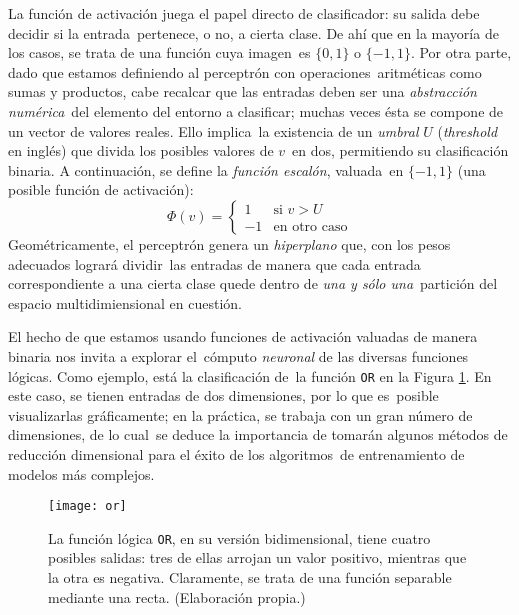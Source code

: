 La función de activación juega el papel directo de clasificador: su salida debe decidir si la entrada\
pertenece, o no, a cierta clase. De ahí que en la mayoría de los casos, se trata de una función cuya imagen\
es $\{0,1\}$ o $\{-1,1\}$. Por otra parte, dado que estamos definiendo al perceptrón con operaciones\
aritméticas como sumas y productos, cabe recalcar que las entradas deben ser una \emph{abstracción numérica}\
del elemento del entorno a clasificar; muchas veces ésta se compone de un vector de valores reales. Ello implica\
la existencia de un \emph{umbral} $U$ (\emph{threshold} en inglés) que divida los posibles valores de $v$\
en dos, permitiendo su clasificación binaria. A continuación, se define la \emph{función escalón}, valuada\
en $\{-1,1\}$ (una posible función de activación):
\begin{equation}
  \Phi(v) =
  \begin{cases}
    1 & \text{si } v > U\\
    -1 & \text{en otro caso}
  \end{cases}
\end{equation}
Geométricamente, el perceptrón genera un \emph{hiperplano} que, con los pesos adecuados logrará dividir\
las entradas de manera que cada entrada correspondiente a una cierta clase quede dentro de \emph{una y sólo una}\
partición del espacio multidimiensional en cuestión.\par
El hecho de que estamos usando funciones de activación valuadas de manera binaria nos invita a explorar el\
cómputo \emph{neuronal} de las diversas funciones lógicas. Como ejemplo, está la clasificación de\
la función \verb+OR+ en la Figura \ref{or-fig}. En este caso, se tienen entradas de dos dimensiones, por lo que es\
posible visualizarlas gráficamente; en la práctica, se trabaja con un gran número de dimensiones, de lo cual\
se deduce la importancia de tomarán algunos métodos de reducción dimensional para el éxito de los algoritmos\
de entrenamiento de modelos más complejos.\par

\begin{figure}[H]
  \centering
  \texttt{[image: or]}
  \caption{La función lógica \texttt{OR}, en su versión bidimensional, tiene cuatro posibles salidas:
    tres de ellas arrojan un valor positivo, mientras que la otra es negativa. Claramente, se trata de una función
    separable mediante una recta.
    (Elaboración propia.)}
  \label{or-fig}
\end{figure}

